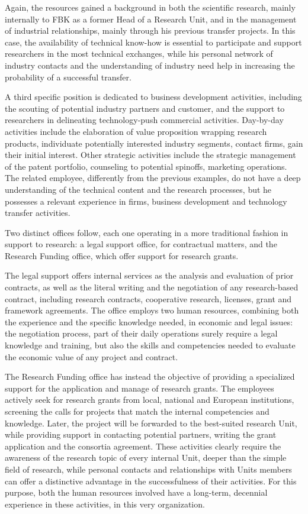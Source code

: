 Again, the resources gained a background in both the scientific research, mainly internally to FBK as a former Head of a Research Unit, and in the management of industrial relationships, mainly through his previous transfer projects. In this case, the availability of technical know-how is essential to participate and support researchers in the most technical exchanges, while his personal network of industry contacts and the understanding of industry need help in increasing the probability of a successful transfer.

A third specific position is dedicated to business development activities, including the scouting of potential industry partners and customer, and the support to researchers in delineating technology-push commercial activities. Day-by-day activities include the elaboration of value proposition wrapping research products, individuate potentially interested industry segments, contact firms, gain their initial interest. Other strategic activities include the strategic management of the patent portfolio, counseling to potential spinoffs, marketing operations. The related employee, differently from the previous examples, do not have a deep understanding of the technical content and the research processes, but he possesses a relevant experience in firms, business development and technology transfer activities.

Two distinct offices follow, each one operating in a more traditional fashion in support to research: a legal support office, for contractual matters, and the Research Funding office, which offer support for research grants.

The legal support offers internal services as the analysis and evaluation of prior contracts, as well as the literal writing and the negotiation of any research-based contract, including research contracts, cooperative research, licenses, grant and framework agreements. The office employs two human resources, combining both the experience and the specific knowledge needed, in economic and legal issues: the negotiation process, part of their daily operations surely require a legal knowledge and training, but also the skills and competencies needed to evaluate the economic value of any project and contract. 

The Research Funding office has instead the objective of providing a specialized support for the application and manage of research grants. The employees actively seek for research grants from local, national and European institutions, screening the calls for projects that match the internal competencies and knowledge. Later, the project will be forwarded to the best-suited research Unit, while providing support in contacting potential partners, writing the grant application and the consortia agreement. These activities clearly require the awareness of the research topic of every internal Unit, deeper than the simple field of research, while personal contacts and relationships with Units members can offer a distinctive advantage in the successfulness of their activities. For this purpose, both the human resources involved have a long-term, decennial experience in these activities, in this very organization.

